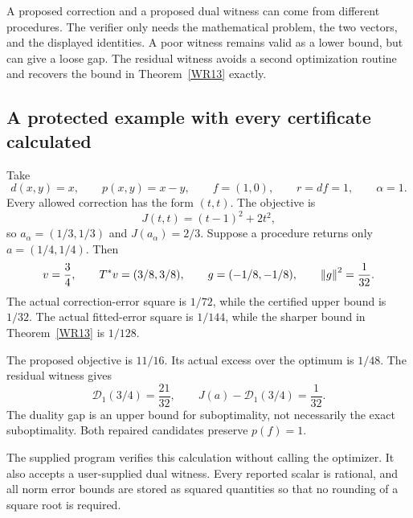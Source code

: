A proposed correction and a proposed dual witness can come from different procedures. The verifier only needs the mathematical problem, the two vectors, and the displayed identities. A poor witness remains valid as a lower bound, but can give a loose gap. The residual witness avoids a second optimization routine and recovers the bound in Theorem~\ref{WR13} exactly.

\subsection{A protected example with every certificate calculated}
Take
\[
 d(x,y)=x,\qquad p(x,y)=x-y,\qquad f=(1,0),\qquad r=df=1,\qquad\alpha=1.
\]
Every allowed correction has the form $(t,t)$. The objective is
\[
 J(t,t)=(t-1)^2+2t^2,
\]
so $a_\alpha=(1/3,1/3)$ and $J(a_\alpha)=2/3$. Suppose a procedure returns only $a=(1/4,1/4)$. Then
\[
 v=\frac34,\qquad T^*v=(3/8,3/8),\qquad
 g=(-1/8,-1/8),\qquad\left\lVert g\right\rVert^2=\frac1{32}.
\]
The actual correction-error square is $1/72$, while the certified upper bound is $1/32$. The actual fitted-error square is $1/144$, while the sharper bound in Theorem~\ref{WR13} is $1/128$.

The proposed objective is $11/16$. Its actual excess over the optimum is $1/48$. The residual witness gives
\[
 \mathcal D_1(3/4)=\frac{21}{32},\qquad
 J(a)-\mathcal D_1(3/4)=\frac1{32}.
\]
The duality gap is an upper bound for suboptimality, not necessarily the exact suboptimality. Both repaired candidates preserve $p(f)=1$.


The supplied program  verifies this calculation without calling the optimizer. It also accepts a user-supplied dual witness. Every reported scalar is rational, and all norm error bounds are stored as squared quantities so that no rounding of a square root is required.
